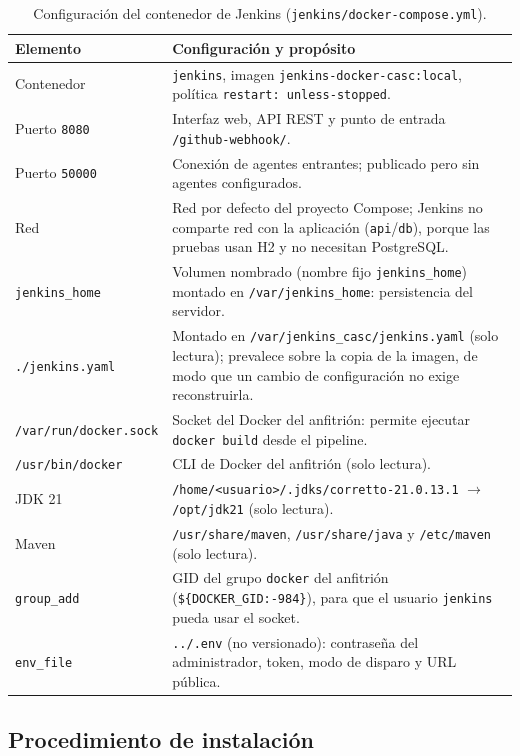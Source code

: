\documentclass[11pt,a4paper]{article}
\begin{document}
\begin{table}[H]
\centering
\small
\begin{tabularx}{\textwidth}{@{}P{3.7cm} L@{}}
\toprule
\textbf{Elemento} & \textbf{Configuración y propósito}\\
\midrule
Contenedor & \texttt{jenkins}, imagen \texttt{jenkins-docker-casc:local}, política
\texttt{restart: unless-stopped}.\\
Puerto \texttt{8080} & Interfaz web, API REST y punto de entrada \texttt{/github-webhook/}.\\
Puerto \texttt{50000} & Conexión de agentes entrantes; publicado pero sin agentes configurados.\\
Red & Red por defecto del proyecto Compose; Jenkins no comparte red con la aplicación
(\texttt{api}/\texttt{db}), porque las pruebas usan H2 y no necesitan PostgreSQL.\\
\texttt{jenkins\_home} & Volumen nombrado (nombre fijo \texttt{jenkins\_home}) montado en
\texttt{/var/jenkins\_home}: persistencia del servidor.\\
\texttt{./jenkins.yaml} & Montado en \texttt{/var/jenkins\_casc/jenkins.yaml} (solo lectura);
prevalece sobre la copia de la imagen, de modo que un cambio de configuración no exige reconstruirla.\\
\texttt{/var/run/docker.sock} & Socket del Docker del anfitrión: permite ejecutar
\texttt{docker build} desde el pipeline.\\
\texttt{/usr/bin/docker} & CLI de Docker del anfitrión (solo lectura).\\
JDK 21 & \texttt{/home/<usuario>/.jdks/corretto-21.0.13.1} $\rightarrow$ \texttt{/opt/jdk21} (solo lectura).\\
Maven & \texttt{/usr/share/maven}, \texttt{/usr/share/java} y \texttt{/etc/maven} (solo lectura).\\
\texttt{group\_add} & GID del grupo \texttt{docker} del anfitrión (\texttt{\$\{DOCKER\_GID:-984\}}),
para que el usuario \texttt{jenkins} pueda usar el socket.\\
\texttt{env\_file} & \texttt{../.env} (no versionado): contraseña del administrador, token, modo de
disparo y URL pública.\\
\bottomrule
\end{tabularx}
\caption{Configuración del contenedor de Jenkins (\texttt{jenkins/docker-compose.yml}).}
\label{tab:compose-jenkins}
\end{table}

\subsection{Procedimiento de instalación}
\end{document}
